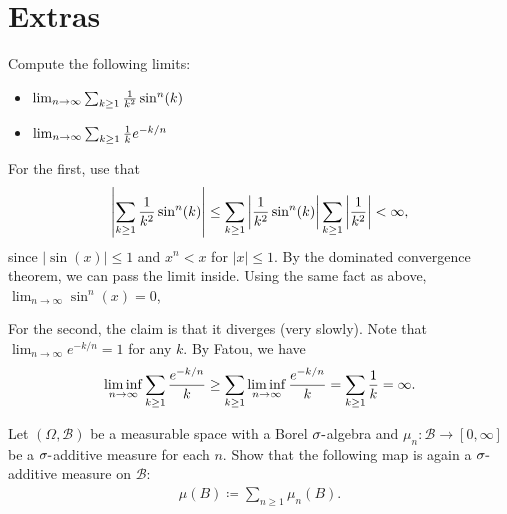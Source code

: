 \hypertarget{extras}{%
\section{Extras}\label{extras}}

\begin{exercise}[?]

Compute the following limits:

\begin{itemize}
\tightlist
\item
  \(\lim_{n\to\infty} \sum_{k\geq 1} {1\over k^2} \sin^n(k)\)
\item
  \(\lim_{n\to\infty} \sum_{k\geq 1} {1\over k} e^{-k/n}\)
\end{itemize}

\end{exercise}

\begin{solution}

For the first, use that
\begin{align*}
{\left\lvert { \sum_{k\geq 1} {1\over k^2} \sin^n(k) } \right\rvert}
\leq
\sum_{k\geq 1} {\left\lvert { {1\over k^2} \sin^n(k) } \right\rvert}
\sum_{k\geq 1} {\left\lvert { {1\over k^2}} \right\rvert} < \infty
,\end{align*}
since \({\left\lvert {\sin(x)} \right\rvert} \leq 1\) and \(x^n < x\)
for \({\left\lvert {x} \right\rvert}\leq 1\). By the dominated
convergence theorem, we can pass the limit inside. Using the same fact
as above, \(\lim_{n\to\infty}\sin^n(x) = 0\),

For the second, the claim is that it diverges (very slowly). Note that
\(\lim_{n\to\infty} e^{-k/n} = 1\) for any \(k\). By Fatou, we have
\begin{align*}
\liminf_{n\to\infty} \sum_{k\geq 1} {e^{-k/n} \over k}
\geq \sum_{k\geq 1} \liminf_{n\to\infty} {e^{-k/n} \over k} 
= \sum_{k\geq 1} {1 \over k} 
= \infty
.\end{align*}

\end{solution}

\begin{exercise}[?]

Let \((\Omega,{\mathcal{B}})\) be a measurable space with a Borel
\(\sigma{\hbox{-}}\)algebra and \(\mu_n: {\mathcal{B}}\to [0, \infty]\)
be a \(\sigma{\hbox{-}}\)additive measure for each \(n\). Show that the
following map is again a \(\sigma{\hbox{-}}\)additive measure on
\({\mathcal{B}}\):
\begin{align*}
\mu(B) \coloneqq\sum_{n\geq 1} \mu_n(B)
.\end{align*}

\end{exercise}

